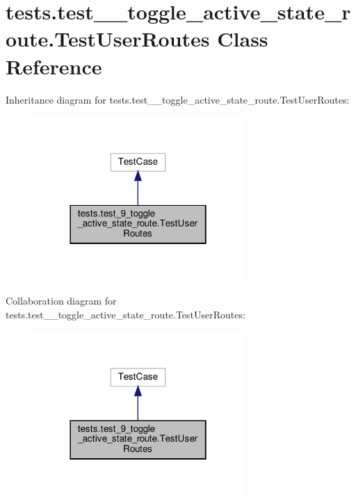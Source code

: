 \hypertarget{classtests_1_1test__9__toggle__active__state__route_1_1_test_user_routes}{}\section{tests.\+test\+\_\+\_\+toggle\+\_\+active\+\_\+state\+\_\+route.\+Test\+User\+Routes Class Reference}
\label{classtests_1_1test__9__toggle__active__state__route_1_1_test_user_routes}


Inheritance diagram for tests.\+test\+\_\+\_\+toggle\+\_\+active\+\_\+state\+\_\+route.\+Test\+User\+Routes\+:
\nopagebreak
\begin{figure}[H]
\begin{center}
\leavevmode
\includegraphics[width=226pt]{classtests_1_1test__9__toggle__active__state__route_1_1_test_user_routes__inherit__graph}
\end{center}
\end{figure}


Collaboration diagram for tests.\+test\+\_\+\_\+toggle\+\_\+active\+\_\+state\+\_\+route.\+Test\+User\+Routes\+:
\nopagebreak
\begin{figure}[H]
\begin{center}
\leavevmode
\includegraphics[width=226pt]{classtests_1_1test__9__toggle__active__state__route_1_1_test_user_routes__coll__graph}
\end{center}
\end{figure}
